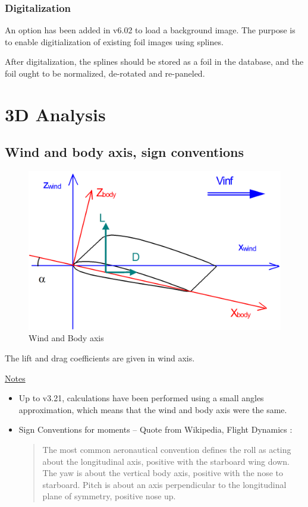 \documentclass[a4paper,twoside,12pt,dvips]{article}
\begin{document}
\subsubsection{Digitalization}

An option has been added in v6.02 to load a background image. The
purpose is to enable digitialization of existing foil images using
splines.

After digitalization, the splines should be stored as a foil in the
database, and the foil ought to be normalized, de-rotated and
re-paneled.

\section{3D Analysis}

\subsection{Wind and body axis, sign conventions}

\begin{figure}[htbp]
  \includegraphics[width=0.8\linewidth]{img-05}\centering 
  \caption{Wind and Body axis}
  \label{fig:wind_and_body_axis}
\end{figure}

The lift and drag coefficients are given in wind axis.

\underline{Notes} 

\begin{itemize}
\item Up to v3.21, calculations have been performed using a small
angles approximation, which means that the wind and body axis were the
same.
\item Sign Conventions for moments -- Quote from Wikipedia, Flight
Dynamics :
\begin{quotation}
The most common aeronautical convention defines the roll as acting
about the longitudinal axis, positive with the starboard wing
down. The yaw is about the vertical body axis, positive with the nose
to starboard. Pitch is about an axis perpendicular to the longitudinal
plane of symmetry, positive nose up.
\end{quotation}
\end{itemize}
\end{document}
